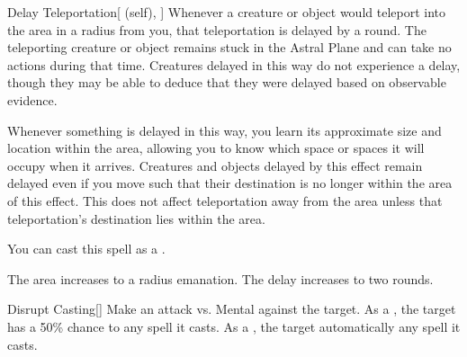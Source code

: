 \lowercase{\hypertarget{spell:Delay Teleportation}{}}\label{spell:Delay Teleportation}
\begin{attuneability}[Rank 4]{\hypertarget{spell:Delay Teleportation}{Delay Teleportation}}[ (self), ]
Whenever a creature or object would teleport into the area in a \arealarge radius  from you, that teleportation is delayed by a round.
The teleporting creature or object remains stuck in the Astral Plane and can take no actions during that time.
Creatures delayed in this way do not experience a delay, though they may be able to deduce that they were delayed based on observable evidence.

Whenever something is delayed in this way, you learn its approximate size and location within the area, allowing you to know which space or spaces it will occupy when it arrives.
Creatures and objects delayed by this effect remain delayed even if you move such that their destination is no longer within the area of this effect.
This does not affect teleportation away from the area unless that teleportation's destination lies within the area.

You can cast this spell as a .

\rankline
{} The area increases to a \areahuge radius emanation.
 The delay increases to two rounds.
\end{attuneability}
\vspace{0.25em}



\lowercase{\hypertarget{spell:Disrupt Casting}{}}\label{spell:Disrupt Casting}
\begin{freeability}[Rank 4]{\hypertarget{spell:Disrupt Casting}{Disrupt Casting}}[]
Make an attack vs. Mental against the target.
\hit As a , the target has a 50\% chance to  any spell it casts.
\crit As a , the target automatically  any spell it casts.
\end{freeability}
\vspace{0.25em}




